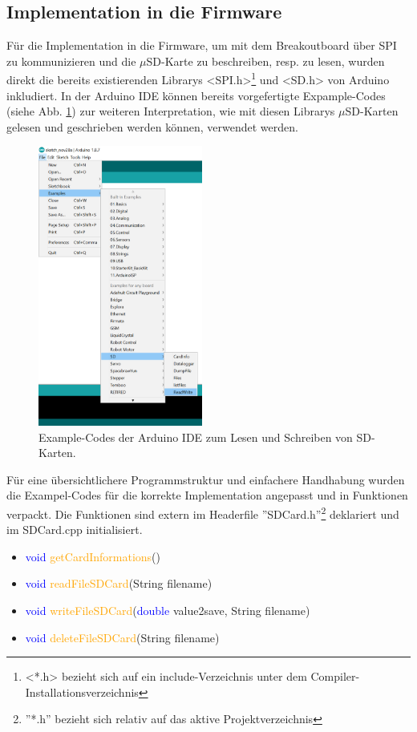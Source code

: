 \subsection{Implementation in die Firmware}
Für die Implementation in die Firmware, um mit dem Breakoutboard über SPI zu kommunizieren und die $\mu$SD-Karte zu beschreiben, resp. zu lesen, wurden direkt die bereits existierenden Librarys <SPI.h>\footnote{ <*.h> bezieht sich auf ein include-Verzeichnis unter dem Compiler-Installationsverzeichnis} und <SD.h> von Arduino inkludiert. In der Arduino IDE können bereits vorgefertigte Expample-Codes (siehe Abb. \ref{fig:exampleCodes}) zur weiteren Interpretation, wie mit diesen Librarys $\mu$SD-Karten gelesen und geschrieben werden können, verwendet werden.\\
\begin{figure}[h]
\centering
\includegraphics[width=0.48\textwidth]{graphics/Datenspeicherung/read_write_examples.PNG}
\caption{Example-Codes der Arduino IDE zum Lesen und Schreiben von SD-Karten.}
\label{fig:exampleCodes}
\end{figure}

Für eine übersichtlichere Programmstruktur und einfachere Handhabung wurden die Exampel-Codes für die korrekte Implementation angepasst und in Funktionen verpackt. Die Funktionen sind extern im Headerfile ''SDCard.h''\footnote{ ''*.h'' bezieht sich relativ auf das aktive Projektverzeichnis} deklariert und im SDCard.cpp initialisiert.
\begin{itemize}
\item \textcolor{blue}{void} \textcolor{orange}{getCardInformations}()
\item \textcolor{blue}{void} \textcolor{orange}{readFileSDCard}(\textcolor{Dandelion}{String} filename)
\item \textcolor{blue}{void} \textcolor{orange}{writeFileSDCard}(\textcolor{blue}{double} value2save, \textcolor{Dandelion}{String} filename)
\item \textcolor{blue}{void} \textcolor{orange}{deleteFileSDCard}(\textcolor{Dandelion}{String} filename)
\end{itemize}
